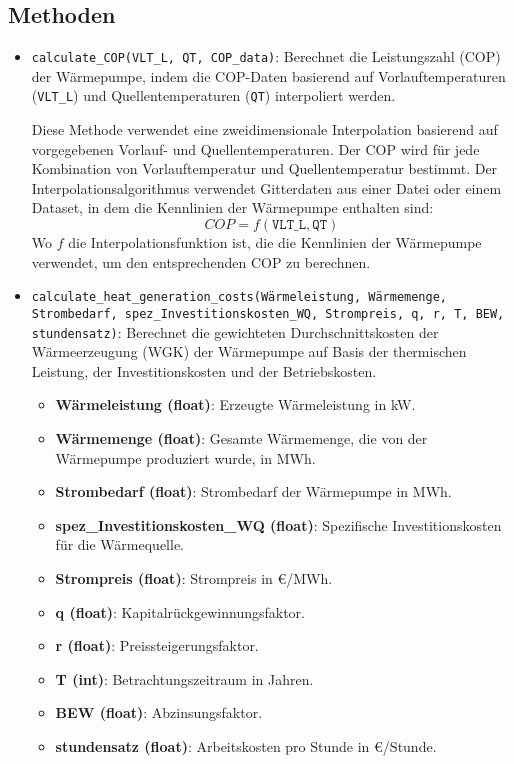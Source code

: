 \subsection{Methoden}
\begin{itemize}
    \item \texttt{calculate\_COP(VLT\_L, QT, COP\_data)}: Berechnet die Leistungszahl (COP) der Wärmepumpe, indem die COP-Daten basierend auf Vorlauftemperaturen (\texttt{VLT\_L}) und Quellentemperaturen (\texttt{QT}) interpoliert werden.
    
    Diese Methode verwendet eine zweidimensionale Interpolation basierend auf vorgegebenen Vorlauf- und Quellentemperaturen. Der COP wird für jede Kombination von Vorlauftemperatur und Quellentemperatur bestimmt. Der Interpolationsalgorithmus verwendet Gitterdaten aus einer Datei oder einem Dataset, in dem die Kennlinien der Wärmepumpe enthalten sind:
    \[
    COP = f(\texttt{VLT\_L}, \texttt{QT})
    \]
    Wo \( f \) die Interpolationsfunktion ist, die die Kennlinien der Wärmepumpe verwendet, um den entsprechenden COP zu berechnen.
    
    \item \texttt{calculate\_heat\_generation\_costs(Wärmeleistung, Wärmemenge, Strombedarf, spez\_Investitionskosten\_WQ, Strompreis, q, r, T, BEW, stundensatz)}: Berechnet die gewichteten Durchschnittskosten der Wärmeerzeugung (WGK) der Wärmepumpe auf Basis der thermischen Leistung, der Investitionskosten und der Betriebskosten.
    
    \begin{itemize}
        \item \textbf{Wärmeleistung (float)}: Erzeugte Wärmeleistung in kW.
        \item \textbf{Wärmemenge (float)}: Gesamte Wärmemenge, die von der Wärmepumpe produziert wurde, in MWh.
        \item \textbf{Strombedarf (float)}: Strombedarf der Wärmepumpe in MWh.
        \item \textbf{spez\_Investitionskosten\_WQ (float)}: Spezifische Investitionskosten für die Wärmequelle.
        \item \textbf{Strompreis (float)}: Strompreis in €/MWh.
        \item \textbf{q (float)}: Kapitalrückgewinnungsfaktor.
        \item \textbf{r (float)}: Preissteigerungsfaktor.
        \item \textbf{T (int)}: Betrachtungszeitraum in Jahren.
        \item \textbf{BEW (float)}: Abzinsungsfaktor.
        \item \textbf{stundensatz (float)}: Arbeitskosten pro Stunde in €/Stunde.
    \end{itemize}
    

\end{itemize}
